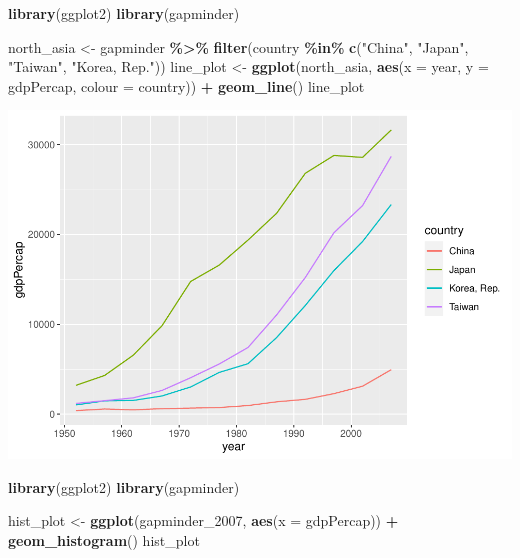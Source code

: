 \documentclass[
]{book}
\newenvironment{Shaded}{\begin{snugshade}}{\end{snugshade}}
\newcommand{\AttributeTok}[1]{\textcolor[rgb]{0.13,0.29,0.53}{#1}}
\newcommand{\FunctionTok}[1]{\textcolor[rgb]{0.13,0.29,0.53}{\textbf{#1}}}
\newcommand{\NormalTok}[1]{#1}
\newcommand{\OtherTok}[1]{\textcolor[rgb]{0.56,0.35,0.01}{#1}}
\newcommand{\SpecialCharTok}[1]{\textcolor[rgb]{0.81,0.36,0.00}{\textbf{#1}}}
\newcommand{\StringTok}[1]{\textcolor[rgb]{0.31,0.60,0.02}{#1}}
\theoremstyle{definition}
\theoremstyle{definition}
\theoremstyle{definition}
\theoremstyle{definition}
\theoremstyle{remark}
\begin{document}
\begin{Shaded}
\begin{Highlighting}[]
\FunctionTok{library}\NormalTok{(ggplot2)}
\FunctionTok{library}\NormalTok{(gapminder)}

\NormalTok{north\_asia }\OtherTok{\textless{}{-}}\NormalTok{ gapminder }\SpecialCharTok{\%\textgreater{}\%}
  \FunctionTok{filter}\NormalTok{(country }\SpecialCharTok{\%in\%} \FunctionTok{c}\NormalTok{(}\StringTok{"China"}\NormalTok{, }\StringTok{"Japan"}\NormalTok{, }\StringTok{"Taiwan"}\NormalTok{, }\StringTok{"Korea, Rep."}\NormalTok{))}
\NormalTok{line\_plot }\OtherTok{\textless{}{-}} \FunctionTok{ggplot}\NormalTok{(north\_asia, }\FunctionTok{aes}\NormalTok{(}\AttributeTok{x =}\NormalTok{ year, }\AttributeTok{y =}\NormalTok{ gdpPercap, }\AttributeTok{colour =}\NormalTok{ country)) }\SpecialCharTok{+}
  \FunctionTok{geom\_line}\NormalTok{()}
\NormalTok{line\_plot}
\end{Highlighting}
\end{Shaded}

\includegraphics{202402211401-R_files/figure-latex/unnamed-chunk-20-1.pdf}

\begin{Shaded}
\begin{Highlighting}[]
\FunctionTok{library}\NormalTok{(ggplot2)}
\FunctionTok{library}\NormalTok{(gapminder)}

\NormalTok{hist\_plot }\OtherTok{\textless{}{-}} \FunctionTok{ggplot}\NormalTok{(gapminder\_2007, }\FunctionTok{aes}\NormalTok{(}\AttributeTok{x =}\NormalTok{ gdpPercap)) }\SpecialCharTok{+}
  \FunctionTok{geom\_histogram}\NormalTok{()}
\NormalTok{hist\_plot}
\end{Highlighting}
\end{Shaded}
\end{document}
